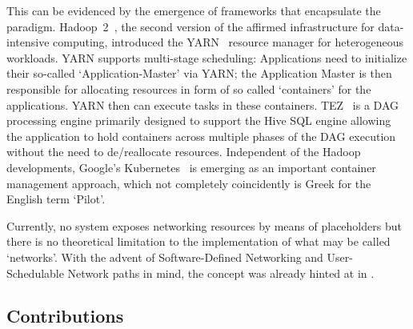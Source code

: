 \documentclass{sig-alternate}
\begin{document}

This can be evidenced by the emergence of frameworks that encapsulate the \pilot
paradigm. Hadoop~2~\cite{hadoop_url}, the second version of the affirmed
infrastructure for data-intensive computing,
introduced the YARN~\cite{vavilapalli2013apache} resource manager for
heterogeneous workloads.
YARN supports multi-stage scheduling: Applications need to initialize their
so-called `Application-Master' via YARN; the Application Master is then
responsible for allocating resources in form of so called `containers' for the
applications. YARN then can execute tasks in these containers.
TEZ~\cite{tez_url} is a DAG processing engine primarily designed to support the
Hive SQL engine allowing the application to hold containers across multiple
phases of the DAG execution without the need to de/reallocate
resources.
Independent of the Hadoop developments, Google's
Kubernetes~\cite{bernstein2014containers} is emerging as an important container
management approach, which not completely coincidently is Greek for the English
term `Pilot'.

Currently, no \pilot system exposes networking resources by means of
placeholders but there is no theoretical limitation to the implementation of
what may be called `\pilot networks'. With the advent of Software-Defined
Networking and User-Schedulable Network paths in mind, the concept was already
hinted at in \cite{santcroos2012}.


%
\subsection{Contributions}
\label{sec:contributions}
\end{document}
